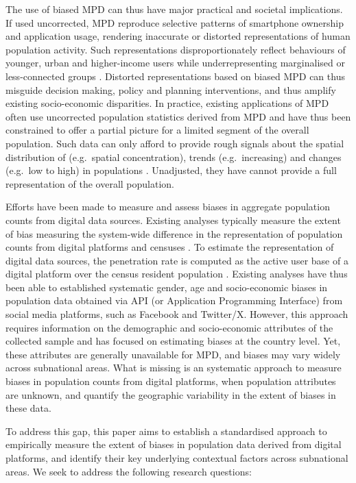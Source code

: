 \documentclass[]{rsos}%
\begin{document}
The use of biased MPD can thus have major practical and societal
implications. If used uncorrected, MPD reproduce selective patterns of
smartphone ownership and application usage, rendering inaccurate or
distorted representations of human population activity. Such
representations disproportionately reflect behaviours of younger, urban
and higher-income users while underrepresenting marginalised or
less-connected groups \citep{porter2012, wesolowski13-biases}. Distorted
representations based on biased MPD can thus misguide decision making,
policy and planning interventions, and thus amplify existing
socio-economic disparities. In practice, existing applications of MPD
often use uncorrected population statistics derived from MPD and have
thus been constrained to offer a partial picture for a limited segment
of the overall population. Such data can only afford to provide rough
signals about the spatial distribution of (e.g.~spatial concentration),
trends (e.g.~increasing) and changes (e.g.~low to high) in populations
\citep{rowe22-sensing-ukraine}. Unadjusted, they have cannot provide a full
representation of the overall population.

Efforts have been made to measure and assess biases in aggregate
population counts from digital data sources. Existing analyses typically
measure the extent of bias measuring the system-wide difference in the
representation of population counts from digital platforms and censuses
\citep{ribeiro20-facebook, zagheni2015, gil-clavel2019}. To estimate the
representation of digital data sources, the penetration rate is computed
as the active user base of a digital platform over the census resident
population \citep{ribeiro20-facebook, gil-clavel2019}. Existing analyses
have thus been able to established systematic gender, age and
socio-economic biases in population data obtained via API (or
Application Programming Interface) from social media platforms, such as
Facebook and Twitter/X. However, this approach requires information on
the demographic and socio-economic attributes of the collected sample
and has focused on estimating biases at the country level. Yet, these
attributes are generally unavailable for MPD, and biases may vary widely
across subnational areas. What is missing is an systematic approach to
measure biases in population counts from digital platforms, when
population attributes are unknown, and quantify the geographic
variability in the extent of biases in these data.

To address this gap, this paper aims to establish a standardised
approach to empirically measure the extent of biases in population data
derived from digital platforms, and identify their key underlying
contextual factors across subnational areas. We seek to address the
following research questions:
\end{document}
